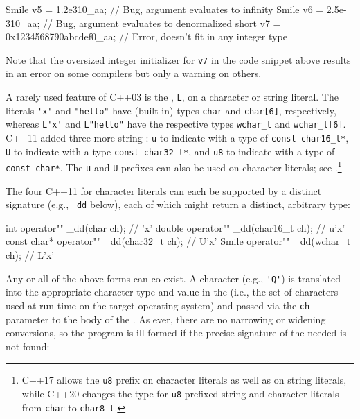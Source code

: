 \begin{emcppslisting}[emcppsbatch=e10]
Smile v5 = 1.2e310_aa;              // Bug, argument evaluates to infinity
Smile v6 = 2.5e-310_aa;             // Bug, argument evaluates to denormalized
short v7 = 0x1234568790abcdef0_aa;  // Error, doesn't fit in any integer type
\end{emcppslisting}

\noindent Note that the oversized integer initializer for \lstinline!v7! in the code snippet above
results in an error on some compilers but only a warning on others.

A rarely used feature of C++03 is the ,
\lstinline!L!, on a character or string literal. The literals \lstinline!'x'!
and \lstinline!"hello"! have (built-in) types \lstinline!char! and
\lstinline!char[6]!, respectively, whereas \lstinline!L'x'! and
\lstinline!L"hello"! have the respective types \lstinline!wchar_t! and
\lstinline!wchar_t[6]!. C++11 added three more string
: \lstinline!u! to indicate 
with a type of \lstinline!const char16_t*!, \lstinline!U! to indicate 
with a type \lstinline!const char32_t*!, and \lstinline!u8! to indicate 
with a type of \lstinline!const char*!.  The \lstinline!u! and \lstinline!U! prefixes can also
be used on character literals; see  .{\cprotect\footnote{C++17 allows the \lstinline!u8! prefix on
  character literals as well as on string literals, while C++20 changes the type for
  \lstinline!u8! prefixed string and character literals from \lstinline!char! to \lstinline!char8_t!.}}

The four C++11  for character literals can
each be supported by a distinct  signature (e.g.,
\lstinline!_dd! below), each of which might return a distinct, arbitrary
type:

\begin{emcppslisting}[emcppsbatch=e10]
int         operator"" _dd(char     ch);  //  'x'
double      operator"" _dd(char16_t ch);  // u'x'
const char* operator"" _dd(char32_t ch);  // U'x'
Smile       operator"" _dd(wchar_t  ch);  // L'x'
\end{emcppslisting}

\noindent Any or all of the above forms can co-exist. A character  (e.g., \lstinline!'Q'!) is translated into the appropriate
character type and value in the  (i.e.,
the set of characters used at run time on the target operating system)
and passed via the \lstinline!ch! parameter to the body of the . As ever, there are no narrowing or widening conversions, so
the program is ill formed if the precise signature of the needed
 is not found:

